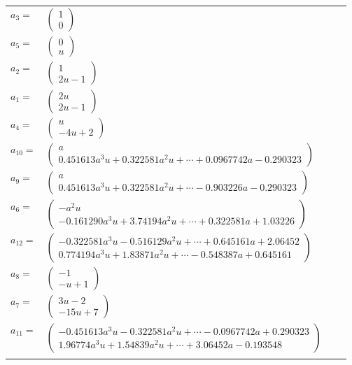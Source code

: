 \documentclass[1p]{elsarticle_modified}
\theoremstyle{definition}
\begin{document}
\begin{tabular}{m{7pt} m{180pt} m{7pt} m{180pt} }
\flushright $a_{3}=$&$\begin{pmatrix}1\\0\end{pmatrix}$ \\
\flushright $a_{5}=$&$\begin{pmatrix}0\\u\end{pmatrix}$ \\
\flushright $a_{2}=$&$\begin{pmatrix}1\\2 u-1\end{pmatrix}$ \\
\flushright $a_{1}=$&$\begin{pmatrix}2 u\\2 u-1\end{pmatrix}$ \\
\flushright $a_{4}=$&$\begin{pmatrix}u\\-4 u+2\end{pmatrix}$ \\
\flushright $a_{10}=$&$\begin{pmatrix}a\\0.451613 a^{3} u+0.322581 a^{2} u+\cdots+0.0967742 a-0.290323\end{pmatrix}$ \\
\flushright $a_{9}=$&$\begin{pmatrix}a\\0.451613 a^{3} u+0.322581 a^{2} u+\cdots-0.903226 a-0.290323\end{pmatrix}$ \\
\flushright $a_{6}=$&$\begin{pmatrix}- a^2 u\\-0.161290 a^{3} u+3.74194 a^{2} u+\cdots+0.322581 a+1.03226\end{pmatrix}$ \\
\flushright $a_{12}=$&$\begin{pmatrix}-0.322581 a^{3} u-0.516129 a^{2} u+\cdots+0.645161 a+2.06452\\0.774194 a^{3} u+1.83871 a^{2} u+\cdots-0.548387 a+0.645161\end{pmatrix}$ \\
\flushright $a_{8}=$&$\begin{pmatrix}-1\\- u+1\end{pmatrix}$ \\
\flushright $a_{7}=$&$\begin{pmatrix}3 u-2\\-15 u+7\end{pmatrix}$ \\
\flushright $a_{11}=$&$\begin{pmatrix}-0.451613 a^{3} u-0.322581 a^{2} u+\cdots-0.0967742 a+0.290323\\1.96774 a^{3} u+1.54839 a^{2} u+\cdots+3.06452 a-0.193548\end{pmatrix}$\\&\end{tabular}
\end{document}
